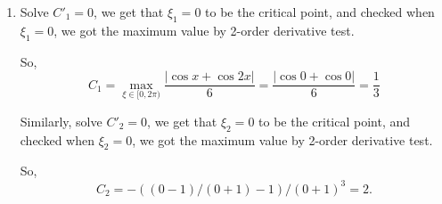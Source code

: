 \documentclass[11pt]{article}
\begin{document}
\begin{enumerate}
		\item Solve $C'_1 = 0$, we get that $\xi_1 = 0$ to be the critical point, and checked when $\xi_1 = 0$, we got the maximum value by 2-order derivative test.
		
			So, $$C_1 = \max_{\xi \in [0,2\pi)} \frac{|\cos{x} + \cos{2x}|}{6} = \frac{|\cos{0} + \cos{0}|}{6} = \frac{1}{3}$$
			
			Similarly, solve $C'_2 = 0$, we get that $\xi_2 = 0$ to be the critical point, and checked when $\xi_2 = 0$, we got the maximum value by 2-order derivative test.
			
			So, $$C_2 = -((0 - 1)/(0 + 1) - 1)/(0 + 1)^3 = 2.$$
	\end{enumerate}
\end{document}
